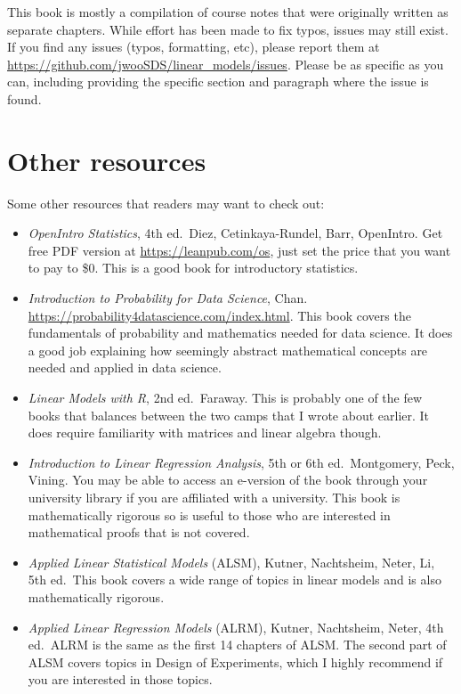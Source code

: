 \documentclass[
]{book}
\begin{document}
This book is mostly a compilation of course notes that were originally written as separate chapters. While effort has been made to fix typos, issues may still exist. If you find any issues (typos, formatting, etc), please report them at \url{https://github.com/jwooSDS/linear_models/issues}. Please be as specific as you can, including providing the specific section and paragraph where the issue is found.

\hypertarget{other-resources}{%
\section*{Other resources}\label{other-resources}}

Some other resources that readers may want to check out:

\begin{itemize}
\item
  \emph{OpenIntro Statistics}, 4th ed.~Diez, Cetinkaya-Rundel, Barr, OpenIntro. Get free PDF version at \url{https://leanpub.com/os}, just set the price that you want to pay to \$0. This is a good book for introductory statistics.
\item
  \emph{Introduction to Probability for Data Science}, Chan. \url{https://probability4datascience.com/index.html}. This book covers the fundamentals of probability and mathematics needed for data science. It does a good job explaining how seemingly abstract mathematical concepts are needed and applied in data science.
\item
  \emph{Linear Models with R}, 2nd ed.~Faraway. This is probably one of the few books that balances between the two camps that I wrote about earlier. It does require familiarity with matrices and linear algebra though.
\item
  \emph{Introduction to Linear Regression Analysis}, 5th or 6th ed.~Montgomery, Peck, Vining. You may be able to access an e-version of the book through your university library if you are affiliated with a university. This book is mathematically rigorous so is useful to those who are interested in mathematical proofs that is not covered.
\item
  \emph{Applied Linear Statistical Models} (ALSM), Kutner, Nachtsheim, Neter, Li, 5th ed.~This book covers a wide range of topics in linear models and is also mathematically rigorous.
\item
  \emph{Applied Linear Regression Models} (ALRM), Kutner, Nachtsheim, Neter, 4th ed.~ALRM is the same as the first 14 chapters of ALSM. The second part of ALSM covers topics in Design of Experiments, which I highly recommend if you are interested in those topics.
\end{itemize}
\end{document}

